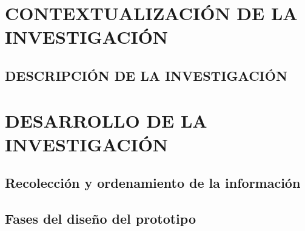 
%




\renewcommand{\tablename}{\textbf{Tabla}}
\renewcommand{\figurename}{\textbf{Figura}}
\renewcommand{\listtablename}{Lista de Tablas}
\renewcommand{\listfigurename}{Lista de Figuras}
\renewcommand{\contentsname}{Contenido}


\tableofcontents
%

\part{CONTEXTUALIZACIÓN DE LA INVESTIGACIÓN}
\chapter{DESCRIPCIÓN DE LA INVESTIGACIÓN}
%







%
%

\part{DESARROLLO DE LA INVESTIGACIÓN}

\chapter{Recolección y ordenamiento de la información}


\chapter{Fases del diseño del prototipo}






